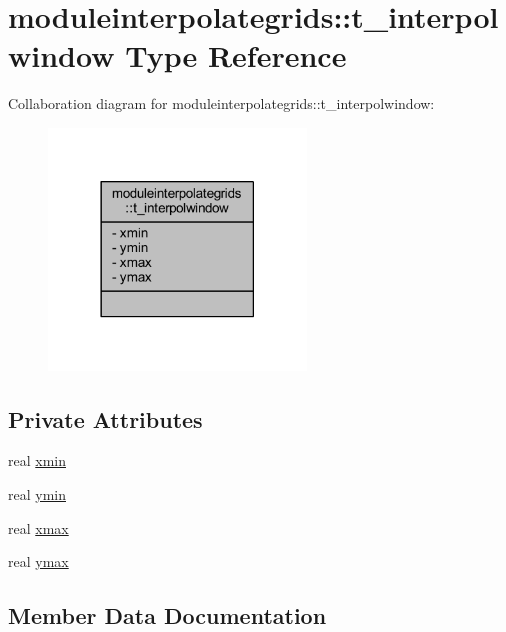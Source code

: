 \hypertarget{structmoduleinterpolategrids_1_1t__interpolwindow}{}\section{moduleinterpolategrids\+:\+:t\+\_\+interpolwindow Type Reference}
\label{structmoduleinterpolategrids_1_1t__interpolwindow}


Collaboration diagram for moduleinterpolategrids\+:\+:t\+\_\+interpolwindow\+:\nopagebreak
\begin{figure}[H]
\begin{center}
\leavevmode
\includegraphics[width=194pt]{structmoduleinterpolategrids_1_1t__interpolwindow__coll__graph}
\end{center}
\end{figure}
\subsection*{Private Attributes}
\begin{DoxyCompactItemize}
\item 
real \mbox{\hyperlink{structmoduleinterpolategrids_1_1t__interpolwindow_a219011c9bbab77ff9c46ad85d5a6d748}{xmin}}
\item 
real \mbox{\hyperlink{structmoduleinterpolategrids_1_1t__interpolwindow_a78072d65719c56e4580d9fba5c26d98c}{ymin}}
\item 
real \mbox{\hyperlink{structmoduleinterpolategrids_1_1t__interpolwindow_af29d2c0a802cb33e7af7a3df12e760e2}{xmax}}
\item 
real \mbox{\hyperlink{structmoduleinterpolategrids_1_1t__interpolwindow_a9dd70f093ad8c586cc8e1a350744cf2a}{ymax}}
\end{DoxyCompactItemize}


\subsection{Member Data Documentation}
\mbox{\label{structmoduleinterpolategrids_1_1t__interpolwindow_af29d2c0a802cb33e7af7a3df12e760e2}} 
